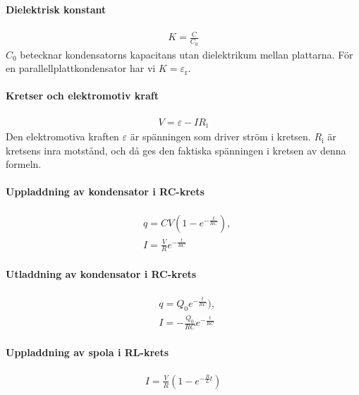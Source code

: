 \paragraph{Dielektrisk konstant}
\begin{align*}
	K = \frac{C}{C_0}
\end{align*}
$C_0$ betecknar kondensatorns kapacitans utan dielektrikum mellan plattarna. För en parallellplattkondensator har vi $K = \varepsilon_\text{r}$.

\paragraph{Kretser och elektromotiv kraft}
\begin{align*}
	V = \varepsilon - IR_\text{i}
\end{align*}
Den elektromotiva kraften $\varepsilon$ är spänningen som driver ström i kretsen. $R_\text{i}$ är kretsens inra motstånd, och då ges den faktiska spänningen i kretsen av denna formeln.

\deriv

\paragraph{Uppladdning av kondensator i RC-krets}
\begin{align*}
	&q = CV(1 - e^{-\frac{t}{RC}}), \\
	&I = \frac{V}{R}e^{-\frac{t}{RC}}
\end{align*}

\deriv

\paragraph{Utladdning av kondensator i RC-krets}
\begin{align*}
	&q = Q_0e^{-\frac{t}{RC}}), \\
	&I = -\frac{Q_0}{RC}e^{-\frac{t}{RC}}
\end{align*}

\deriv

\paragraph{Uppladdning av spola i RL-krets}
\begin{align*}
	I = \frac{V}{R}\left(1 -e^{-\frac{R}{L}t}\right)
\end{align*}

\deriv

